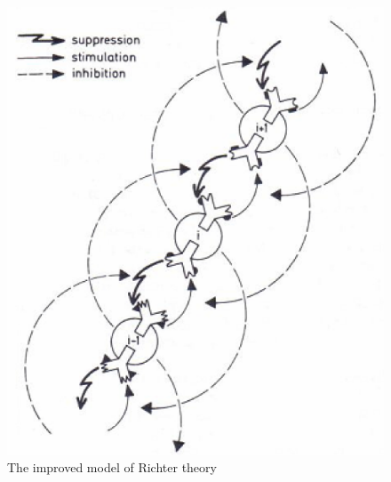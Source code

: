 \documentclass[Proceedings]{ascelike}
\begin{document}
\begin{figure}
\centering
    \includegraphics[scale=0.4] {img/Improved_network_model.png}
    \caption{The improved model of Richter theory}
\end{figure}
\end{document}
